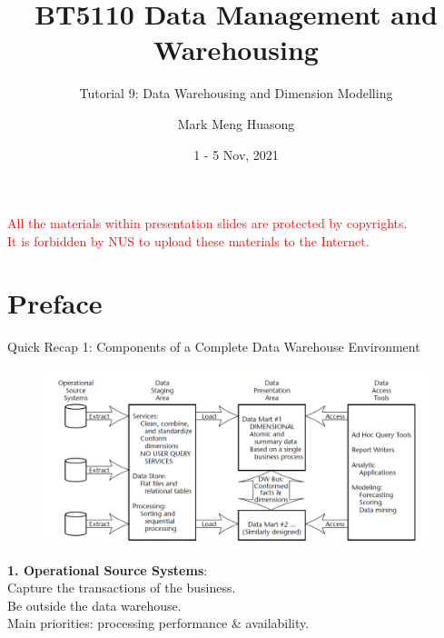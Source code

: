 \title{BT5110 Data Management and Warehousing}

\subtitle{Tutorial 9: Data Warehousing and Dimension Modelling}

\author{Mark Meng Huasong}



\date{1 - 5 Nov, 2021}

\begin{frame}
	\titlepage
	\begin{tcolorbox}
		\begin{center}
			{\scriptsize \textcolor{red}{All the materials within presentation slides are protected by copyrights.\\
					It is forbidden by NUS to upload these materials to the Internet.}}
		\end{center}
	\end{tcolorbox}
\end{frame}

\section*{Preface}

\begin{frame}[fragile]{Quick Recap 1: Components of a Complete Data Warehouse Environment}
\vspace{-10pt}\begin{figure}
	\includegraphics[width=1\textwidth, trim=0 0 0 0, clip]{t9/images/four-components.png}
\end{figure}	
\textbf{1. Operational Source Systems}:\\
Capture the transactions of the business.\\
Be outside the data warehouse.\\
Main priorities: processing performance \& availability. 
\end{frame}

